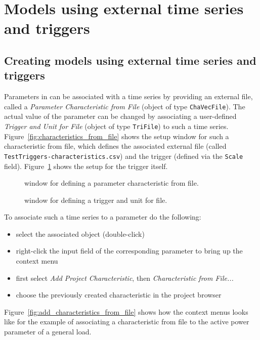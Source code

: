 \section{Models using external time series and triggers}

\subsection{Creating models using external time series and triggers}

Parameters in \pf can be associated with a time series by providing an external file, called a \emph{Parameter Characteristic from File} (\pf object of type \texttt{ChaVecFile}).
The actual value of the parameter can be changed by associating a user-defined \emph{Trigger and Unit for File} (\pf object of type \texttt{TriFile}) to such a time series.
Figure~\ref{fig:characteristics_from_file} shows the setup window for such a characteristic from file, which defines the associated external file (called \texttt{TestTriggers-characteristics.csv}) and the trigger (defined via the \texttt{Scale} field).
Figure~\ref{fig:trigger_for_file} shows the setup for the trigger itself.
\begin{figure}[h!]
\vspace*{-2mm}
\caption{\pf window for defining a parameter characteristic from file.}
\label{fig:characteristics_from_file}
\vspace*{1em}
\vspace*{-2mm}
\caption{\pf window for defining a trigger and unit for file.}
\label{fig:trigger_for_file}
\end{figure}


To associate such a time series to a parameter do the following:
\begin{itemize}
  \item select the associated object (double-click)
  \item right-click the input field of the corresponding parameter to bring up the context menu
  \item first select \emph{Add Project Characteristic}, then \emph{Characteristic from File...}
  \item choose the previously created characteristic in the project browser
\end{itemize} 
Figure~\ref{fig:add_characteristics_from_file} shows how the context menus looks like for the example of associating a characteristic from file to the active power parameter of a general load.

